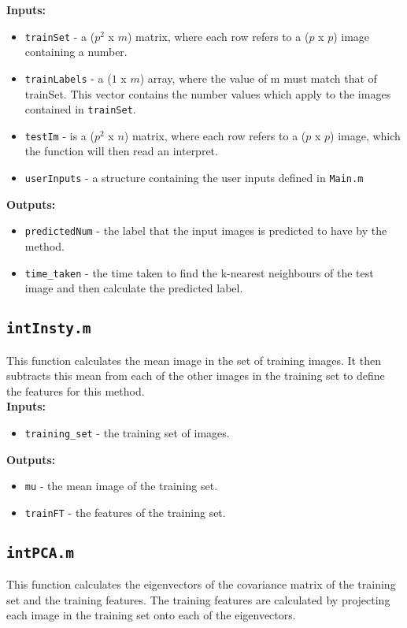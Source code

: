 \documentclass[10pt]{article}
\begin{document}
{\bf Inputs:} 
\begin{itemize} 
\item {\tt trainSet} - a ($p^2$ x $m$) matrix, where each row refers to a ($p$ x $p$) image containing a number.
\item {\tt trainLabels} - a ($1$ x $m$) array, where the value of m must match that of trainSet. This vector contains the number values which apply to the images contained in {\tt trainSet}.
\item {\tt testIm} - is a ($p^2$ x $n$) matrix, where each row refers to a ($p$ x $p$) image, which the function will then read an interpret.
\item {\tt userInputs} - a structure containing the user inputs defined in {\tt Main.m} 
\end{itemize} 

{\bf Outputs:} 
\begin{itemize} 
\item {\tt predictedNum} - the label that the input images is predicted to have by the method. 
\item {\tt time\_taken} - the time taken to find the k-nearest neighbours of the test image and then calculate the predicted label. 
\end{itemize}

\subsection{\tt intInsty.m} 
This function calculates the mean image in the set of training images. It then subtracts this mean from each of the other images in the training set to define the features for this method. \\ 

{\bf Inputs:} 
\begin{itemize}
\item {\tt training\_set} - the training set of images. 
\end{itemize}

{\bf Outputs:}
\begin{itemize}
\item {\tt mu} - the mean image of the training set.
\item {\tt trainFT} - the features of the training set. 
\end{itemize}

\subsection{\tt intPCA.m}
This function calculates the eigenvectors of the covariance matrix of the training set and the training features. The training features are calculated by projecting each image in the training set onto each of the eigenvectors. \\
 
\end{document}
